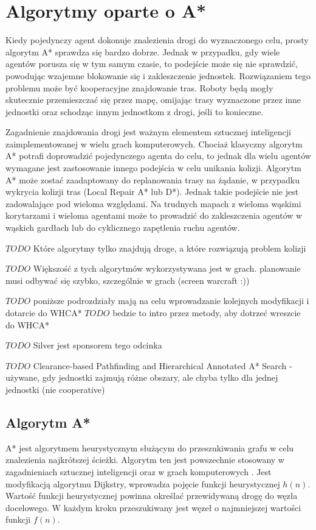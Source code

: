\chapter{Algorytmy oparte o A*}
\label{ch:astar}

Kiedy pojedynczy agent dokonuje znalezienia drogi do wyznaczonego celu, prosty algorytm A* sprawdza się bardzo dobrze. Jednak w przypadku, gdy wiele agentów porusza się w tym samym czasie, to podejście może się nie sprawdzić, powodując wzajemne blokowanie się i zakleszczenie jednostek. Rozwiązaniem tego problemu może być kooperacyjne znajdowanie tras. Roboty będą mogły skutecznie przemieszczać się przez mapę, omijając trasy wyznaczone przez inne jednostki oraz schodząc innym jednostkom z drogi, jeśli to konieczne. \cite{cooppath}

Zagadnienie znajdowania drogi jest ważnym elementem sztucznej inteligencji zaimplementowanej w wielu grach komputerowych. Chociaż klasyczny algorytm A* potrafi doprowadzić pojedynczego agenta do celu, to jednak dla wielu agentów wymagane jest zastosowanie innego podejścia w celu unikania kolizji. Algorytm A* może zostać zaadaptowany do replanowania trasy na żądanie, w przypadku wykrycia kolizji tras (Local Repair A* lub D*). Jednak takie podejście nie jest zadowalające pod wieloma względami. Na trudnych mapach z wieloma wąskimi korytarzami i wieloma agentami może to prowadzić do zakleszczenia agentów w wąskich gardłach lub do cyklicznego zapętlenia ruchu agentów. \cite{cooppath}

$TODO$ Które algorytmy tylko znajdują droge, a które rozwiązują problem kolizji

$TODO$ Większość z tych algorytmów wykorzystywana jest w grach. planowanie musi odbywać się szybko, szczególnie w grach (screen warcraft :))

$TODO$ poniższe podrozdziały mają  na celu wprowadzanie kolejnych modyfikacji i dotarcie do WHCA*
$TODO$ bedzie to intro przez metody, aby dotrzeć wreszcie do WHCA*

$TODO$ Silver jest sponsorem tego odcinka

$TODO$ Clearance-based Pathfinding and Hierarchical Annotated A* Search - używane, gdy jednostki zajmują różne obszary, ale chyba tylko dla jednej jednostki (nie cooperative)

\section{Algorytm A*}
A* jest algorytmem heurystycznym służącym do przeszukiwania grafu w celu znalezienia najkrótszej ścieżki. Algorytm ten jest powszechnie stosowany w zagadnieniach sztucznej inteligencji oraz w grach komputerowych \cite{mit_astar}. Jest modyfikacją algorytmu Dijkstry, wprowadza pojęcie funkcji heurystycznej $h(n)$. Wartość funkcji heurystycznej powinna określać przewidywaną drogę do węzła docelowego. W każdym kroku przeszukiwany jest węzeł o najmniejszej wartości funkcji $f(n)$.

